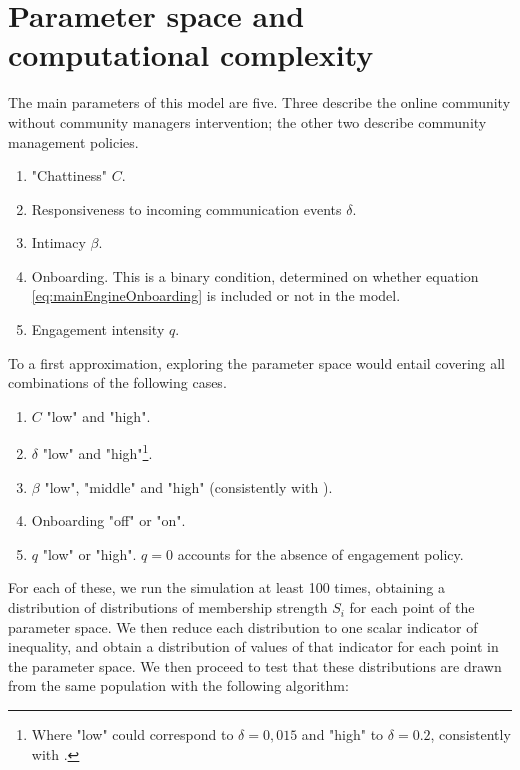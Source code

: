 \documentclass{article}
\begin{document}
\section{Parameter space and computational complexity}

The main parameters of this model are five. Three describe the online community without community managers intervention; the other two describe community management policies.

\begin{enumerate}
	\item "Chattiness" $C$.
	\item Responsiveness to incoming communication events $\delta$.
	\item Intimacy $\beta$.
	\item Onboarding. This is a binary condition, determined on whether equation \ref{eq:mainEngineOnboarding} is included or not in the model.
	\item Engagement intensity $q$.
\end{enumerate}

To a first approximation, exploring the parameter space would entail covering all combinations of the following cases.

\begin{enumerate}
	\item $C$ "low" and "high".
	\item $\delta$ "low" and "high"\footnote{Where "low" could correspond to $\delta = 0,015$ and "high" to $\delta = 0.2$, consistently with \cite{cottica2016microfoundations}.}.
	\item $\beta$ "low", "middle" and "high" (consistently with \cite{kim2015group}).
	\item Onboarding "off" or "on".
	\item $q$ "low" or "high". $q =0$ accounts for the absence of engagement policy.
\end{enumerate}

For each of these, we run the simulation at least 100 times, obtaining a distribution of distributions of membership strength $S_i$ for each point of the parameter space. We then reduce each distribution to one scalar indicator of inequality, and obtain a distribution of values of that indicator for each point in the parameter space. We then proceed to test that these distributions are drawn from the same population with the following algorithm:
\end{document}
